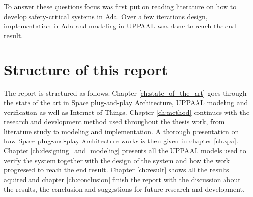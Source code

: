 To answer these questions focus was first put on reading literature on how
to develop safety-critical systems in Ada. Over a few iterations design,
implementation in Ada and modeling in UPPAAL was done to reach the end result.

\section{Structure of this report}
The report is structured as follows. Chapter \ref{ch:state_of_the_art} goes
through the state of the art in Space plug-and-play Architecture, UPPAAL
modeling and verification as well as Internet of Things.  Chapter
\ref{ch:method} continues with the research and development
method used throughout the thesis work, from literature study to modeling and
implementation. A thorough presentation on how Space plug-and-play Architecture
works is then given in chapter \ref{ch:spa}. Chapter
\ref{ch:designing_and_modeling} presents all the UPPAAL models used to verify
the system together with the design of the system and how the work progressed
to reach the end result. Chapter \ref{ch:result}
shows all the results aquired and chapter \ref{ch:conclusion} finish the report
with the discussion about the results, the conclusion and suggestions for
future research and development.


